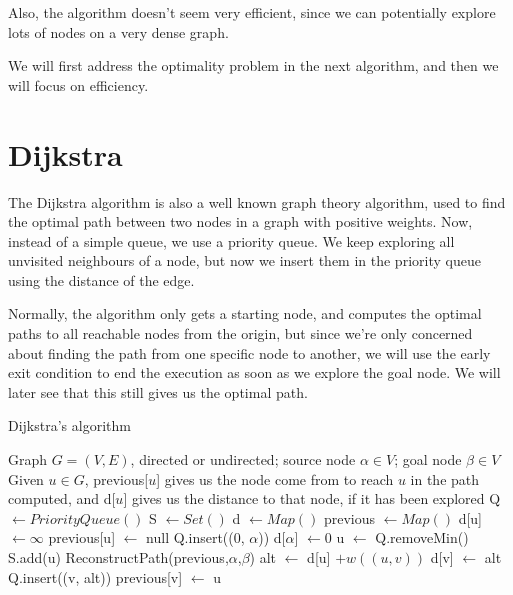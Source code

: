 \documentclass[12pt]{report}
\begin{document}
Also, the algorithm doesn't seem very efficient, since we can potentially explore lots of nodes on a very dense graph.

We will first address the optimality problem in the next algorithm, and then we will focus on efficiency.

\section{Dijkstra}
The Dijkstra algorithm is also a well known graph theory algorithm, used to find the optimal path between two nodes in a graph with positive weights. Now, instead of a simple queue, we use a priority queue. We keep exploring all unvisited neighbours of a node, but now we insert them in the priority queue using the distance of the edge.

Normally, the algorithm only gets a starting node, and computes the optimal paths to all reachable nodes from the origin, but since we're only concerned about finding the path from one specific node to another, we will use the early exit condition to end the execution as soon as we explore the goal node. We will later see that this still gives us the optimal path.

\begin{algorithm}
\caption{Dijkstra's algorithm}
\label{alg:dijkstra}
\begin{algorithmic}[1]
\Require Graph $G = (V, E)$, directed or undirected; source node $\alpha \in V$; goal node $\beta \in V$
\Ensure Given $u \in G$, previous[$u$] gives us the node come from to reach $u$ in the path computed, and d[$u$] gives us the distance to that node, if it has been explored
\State Q $\gets PriorityQueue()$
\State S $\gets Set()$
\State d $\gets Map()$ 
\State previous $\gets Map()$
	\State d[u] $\gets \infty$
	\State previous[u] $\gets$ null
\EndFor
\State Q.insert((0, $\alpha$))
\State d[$\alpha$] $\gets 0$
	\State u $\gets$ Q.removeMin()
	\State S.add(u)
	 
		\State \Return ReconstructPath(previous,$\alpha$,$\beta$)
	\EndIf
			\Continue {}
		\EndIf
		\State alt $\gets$ d[u] $+ w((u, v))$
			\State d[v] $\gets$ alt
			\State Q.insert((v, alt))
			\State previous[v] $\gets$ u
		\EndIf
	\EndFor
\EndWhile
\EndProcedure
\end{algorithmic}
\end{algorithm}
\end{document}
